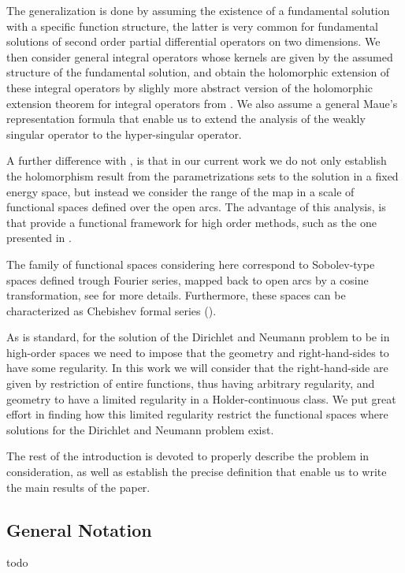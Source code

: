 \documentclass{article}
\begin{document}
The generalization is done by assuming the existence of a fundamental solution with a specific function structure, the latter is very common for  fundamental solutions of second order partial differential operators on two dimensions. We then consider general integral operators whose kernels are given by the assumed structure of the fundamental solution, and obtain the holomorphic extension of these integral operators by  slighly more abstract version of the holomorphic extension theorem for integral operators  from \cite[Theorem 3.12]{Henriquez2021}. We also assume a general Maue's representation formula that enable us to extend the analysis of the weakly singular operator to the hyper-singular operator. 

A further difference with \cite{Henriquez2021}, is that in our current work we do not only establish the holomorphism result from the parametrizations sets to the solution in a fixed energy space, but instead we consider the range of the map in a  scale of functional spaces defined over the open arcs. The advantage of this analysis, is that provide a functional  framework for high order methods, such as the one presented in \cite{JHP20}. 

The family of functional spaces considering here correspond to Sobolev-type spaces defined trough Fourier series, mapped back to open arcs by a cosine transformation, see  \cite[Chapter 11]{saranen2013periodic} for more details. Furthermore, these spaces can be characterized as Chebishev formal series (\cite{Averseng2019}). 

As is standard, for the solution of the Dirichlet and Neumann problem to be in high-order spaces we need to impose that the geometry and right-hand-sides  to have some regularity. In this work we will consider that the right-hand-side are given by restriction of entire functions, thus having arbitrary regularity, and geometry to have a limited regularity in a Holder-continuous class. We put great effort in finding how this limited regularity restrict the functional spaces where solutions for the Dirichlet and Neumann problem exist. 

The rest of the introduction is devoted to properly describe the problem in consideration, as well as establish the precise definition that enable us to write the main results of the paper. 

\subsection{General Notation}
todo
\end{document}
